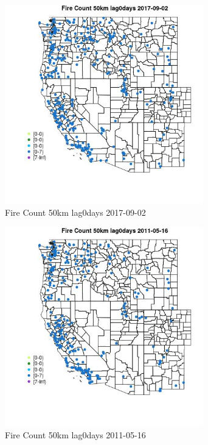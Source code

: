 \begin{figure} 
\centering  
\includegraphics[width=0.77\textwidth]{Code_Outputs/Report_ML_input_PM25_Step4_part_e_de_duplicated_aves_compiled_2019-05-21wNAs_MapObsFire_Count_50km_lag0days2017-09-02.jpg} 
\caption{\label{fig:Report_ML_input_PM25_Step4_part_e_de_duplicated_aves_compiled_2019-05-21wNAsMapObsFire_Count_50km_lag0days2017-09-02}Fire Count 50km lag0days 2017-09-02} 
\end{figure} 
 

\begin{figure} 
\centering  
\includegraphics[width=0.77\textwidth]{Code_Outputs/Report_ML_input_PM25_Step4_part_e_de_duplicated_aves_compiled_2019-05-21wNAs_MapObsFire_Count_50km_lag0days2011-05-16.jpg} 
\caption{\label{fig:Report_ML_input_PM25_Step4_part_e_de_duplicated_aves_compiled_2019-05-21wNAsMapObsFire_Count_50km_lag0days2011-05-16}Fire Count 50km lag0days 2011-05-16} 
\end{figure} 
 


